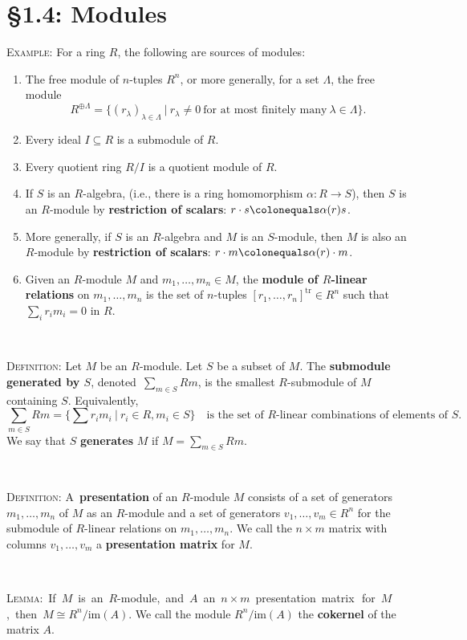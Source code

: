 \documentclass[12pt]{amsart}
\newcommand{\tr}{\mathrm{tr}}
\newcommand{\im}{\mathrm{im}}
\newcommand{\showsol}[1]{\def\displaysol{#1}}
\newcommand\ceq{\colonequals}
\begin{document}
\showsol{0}
	
	\thispagestyle{empty}
	
	\section*{\S1.4: Modules}	

\begin{framed}
\noindent \textsc{Example:} For a ring $R$, the following are sources of modules:
\begin{enumerate}
\item The free module of $n$-tuples $R^n$, or more generally, for a set $\Lambda$, the free module
\[ R^{\oplus \Lambda} = \{ (r_\lambda)_{\lambda\in\Lambda} \ | \ r_\lambda\neq 0 \ \text{for at most finitely many} \ \lambda\in\Lambda\}.\]
\item Every ideal $I\subseteq R$ is a submodule of $R$.
\item Every quotient ring $R/I$ is a quotient module of $R$.
\item If $S$ is an $R$-algebra, (i.e., there is a ring homomorphism $\alpha: R\to S$), then $S$ is an $R$-module by \textbf{restriction of scalars}:
$r \cdot s \ceq \alpha(r) s$.
\item More generally, if $S$ is an $R$-algebra and $M$ is an $S$-module, then $M$ is also an $R$-module by \textbf{restriction of scalars}: $r \cdot m \ceq \alpha(r) \cdot m$.
\item Given an $R$-module $M$ and $m_1,\dots,m_n\in M$, the \textbf{module of $R$-linear relations} on $m_1,\dots,m_n$ is the set of $n$-tuples $[r_1,\dots,r_n]^\tr \in R^n$ such that $\sum_i r_i m_i=0$ in $R$.
\end{enumerate}
 
 \
 
 \noindent \textsc{Definition:} Let $M$ be an $R$-module. Let $S$ be a subset of $M$. The \textbf{submodule generated by $S$}, denoted\footnotemark \, $\sum_{m\in S} Rm$, is the smallest $R$-submodule of $M$ containing $S$. Equivalently, 
\[ \sum_{m\in S} Rm = \big\{ \sum r_i m_i \ | \ r_i \in R, m_i \in S\big\} \quad \text{is the set of $R$-linear combinations of elements of $S$.}\]
We say that $S$ \textbf{generates} $M$ if $M=\sum_{m\in S} Rm$.

\

\noindent \textsc{Definition:} A\footnotemark\ \textbf{presentation} of an $R$-module $M$ consists of a set of generators $m_1,\dots,m_n$ of $M$ as an $R$-module and a set of generators $v_1,\dots, v_m\in R^n$ for the submodule of $R$-linear relations on $m_1,\dots,m_n$. We call the $n \times m$ matrix with columns $v_1,\dots, v_m$ a \textbf{presentation matrix} for $M$. 

\

\noindent \textsc{Lemma:}\mbox{ If $M$ is an $R$-module, and $A$ an $n\times m$ presentation matrix\footnotemark\, for $M$,~then~${M\cong R^n / \im(A)}$.} We call the module $R^n / \im(A)$ the \textbf{cokernel} of the matrix $A$.


 \end{framed}
\end{document}
